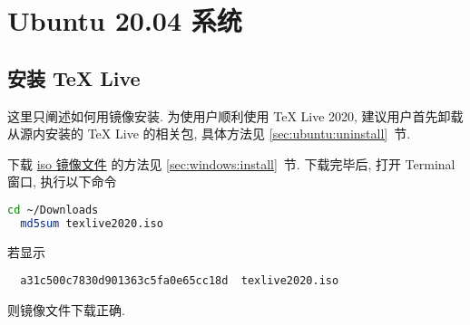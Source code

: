 
\chapter{Ubuntu 20.04 系统}

\section{安装 \TeX{} Live}

这里只阐述如何用镜像安装.
为使用户顺利使用 \TeX{} Live 2020,
建议用户首先卸载从源内安装的 \TeX{} Live 的相关包,
具体方法见 \ref{sec:ubuntu:uninstall}~节.

下载
\href{https://mirrors.ctan.org/systems/texlive/Images/texlive2020.iso}{iso 镜像文件}
的方法见 \ref{sec:windows:install}~节.
下载完毕后, 打开 \textsf{Terminal} 窗口, 执行以下命令
\begin{lstlisting}[language = bash]
  cd ~/Downloads
  md5sum texlive2020.iso
\end{lstlisting}
若显示
\begin{lstlisting}
  a31c500c7830d901363c5fa0e65cc18d  texlive2020.iso
\end{lstlisting}
则镜像文件下载正确.

